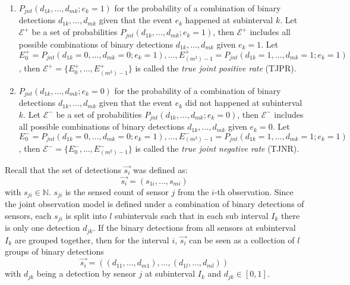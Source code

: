 \begin{enumerate}
    \item $P_{jnt}(d_{1k}, \ldots, d_{mk} ; e_k = 1)$ for the probability of a combination of binary detections $d_{1k}, \ldots, d_{mk}$ given that the event $e_k$ happened at subinterval $k$. Let $\mathcal E^+$ be a set of probabilities $P_{jnt}(d_{1k}, \ldots, d_{mk} ; e_k = 1)$, then $\mathcal E^+$ includes all possible combinations of binary detections $d_{1k}, \ldots, d_{mk}$ given $e_k = 1$. Let $E^+_0 = P_{jnt}(d_{1k} = 0, \ldots, d_{mk} = 0 ; e_k = 1), \ldots, E^+_{(m^2)-1} = P_{jnt}(d_{1k} = 1, \ldots, d_{mk} = 1 ; e_k = 1)$, then $\mathcal E^+ = \big \{ E^+_0, \ldots, E^+_{(m^2)-1} \big \}$ is called the \textit{true joint positive rate} (TJPR). \\
    \item $P_{jnt}(d_{1k}, \ldots, d_{mk} ; e_k = 0)$ for the probability of a combination of binary detections $d_{1k}, \ldots, d_{mk}$ given that the event $e_k$ did not happened at subinterval $k$. Let $\mathcal E^-$ be a set of probabilities $P_{jnt}(d_{1k}, \ldots, d_{mk} ; e_k = 0)$, then $\mathcal E^-$ includes all possible combinations of binary detections $d_{1k}, \ldots, d_{mk}$ given $e_k = 0$. Let $E^-_0 = P_{jnt}(d_{1k} = 0, \ldots, d_{mk} = 0 ; e_k = 1), \ldots, E^-_{(m^2)-1} = P_{jnt}(d_{1k} = 1, \ldots, d_{mk} = 1 ; e_k = 1)$, then $\mathcal E^- = \big \{ E^-_0, \ldots, E^-_{(m^2)-1} \big \}$ is called the \textit{true joint negative rate} (TJNR).
\end{enumerate}

Recall that the set of detections $\overrightarrow{s_i}$ was defined as:
\begin{equation*}
    \overrightarrow{s_i} = (s_{1i}, \ldots, s_{mi})
\end{equation*}
with $s_{ji} \in \mathbb N$. $s_{ji}$ is the sensed count of sensor $j$ from the $i$-th observation. Since the joint observation model is defined under a combination of binary detections of sensors, each $s_{ji}$ is split into $l$ subintervals such that in each sub interval $I_k$ there is only one detection $d_{jk}$. If the binary detections from all sensors at subinterval $I_k$ are grouped together, then for the interval $i$, $\overrightarrow{s_i}$ can be seen as a collection of $l$ groups of binary detections
\begin{equation}
    \label{eq:s_i_definition}
    \overrightarrow{s_i} = ((d_{11}, \ldots, d_{m1}), \ldots, (d_{1l}, \ldots, d_{ml}))
\end{equation}
\noindent with $d_{jk}$ being a detection by sensor $j$ at subinterval $I_k$ and $d_{jk} \in [0, 1]$.

